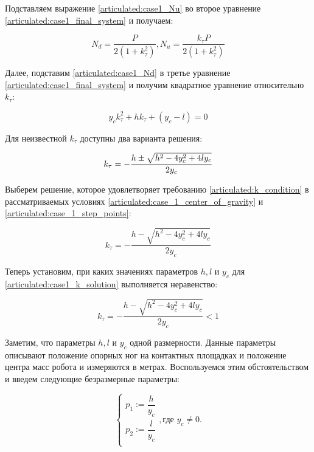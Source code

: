 Подставляем выражение \ref{articulated:case1_Nu} во второе уравнение \ref{articulated:case1_final_system} и получаем:

\begin{equation}
  \label{articulated:case1_Nd}
  N_d = \dfrac{P}{2(1+k_\tau^2)}, N_u = \dfrac{k_\tau P}{2(1+k_\tau^2)}
\end{equation}


Далее, подставим \ref{articulated:case1_Nd} в третье уравнение \ref{articulated:case1_final_system} и получим квадратное уравнение относительно $k_\tau$:

\begin{equation}
\label{articulated:case1_k}
y_ck_\tau^2+hk_\tau + (y_c-l) = 0
\end{equation}

Для неизвестной $k_\tau$ доступны два варианта решения:

\begin{equation}
\label{articulated:case1_k12}
    k_\tau = -\dfrac{h \pm \sqrt{h^2 - 4y_c^2 + 4ly_c}}{2y_c} \\
\end{equation}


Выберем решение, которое удовлетворяет требованию \ref{articulated:k_condition} в рассматриваемых условиях \ref{articulated:case_1_center_of_gravity} и \ref{articulated:case_1_step_points}:

\begin{equation}
\label{articulated:case1_k_solution}
  k_\tau = -\dfrac{h - \sqrt{h^2 - 4y_c^2 + 4ly_c}}{2y_c}
\end{equation}

Теперь установим, при каких значениях параметров $h,l$ и $y_c$ для \ref{articulated:case1_k_solution} выполняется неравенство:

\begin{equation}
\label{articulated:case1_k_less_one}
  k_\tau = -\dfrac{h - \sqrt{h^2 - 4y_c^2 + 4ly_c}}{2y_c} < 1  
\end{equation}

Заметим, что параметры $h,l$ и $y_c$ одной размерности. Данные параметры описывают положение опорных ног на контактных площадках и положение центра масс робота и измеряются в метрах. Воспользуемся этим обстоятельством и введем следующие безразмерные параметры:

\begin{equation}
\label{articulated:case1_dimless}
\left\{
\begin{alignedat}{1}
  p_1 := \dfrac{h}{y_c}\\
  p_2 := \dfrac{l}{y_c}\\
\end{alignedat}, \text{где } y_c \ne 0.
\right.
\end{equation}


